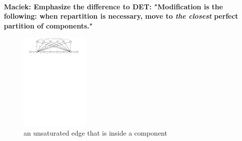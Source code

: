 \documentclass[manuscript,screen=true, review, anonymous]{acmart}
\newcommand\maciek[1]{\color{brown}\textbf{\\ Maciek: #1}\color{black}}
\begin{document}
\maciek{Emphasize the difference to DET: "Modification is the following: when repartition is necessary, move to \emph{the closest} perfect partition of components."}




  \begin{figure}[H]
    \centering
      \includegraphics[width=0.3\textwidth]{figs/substitute}
      \caption{an unsaturated edge that is inside a component}
    \end{figure}
  
\end{document}
